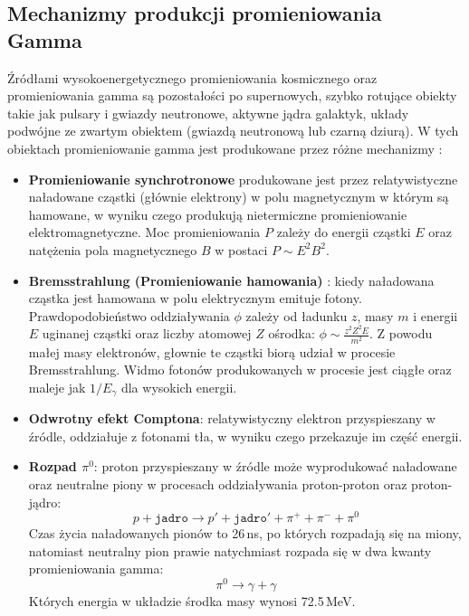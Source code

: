 \documentclass[a4paper,11pt,twoside]{article}
\begin{document}
\subsection{Mechanizmy produkcji promieniowania Gamma}
Źródłami wysokoenergetycznego promieniowania kosmicznego oraz promieniowania gamma są pozostałości po supernowych, szybko rotujące obiekty takie jak pulsary i gwiazdy neutronowe, aktywne jądra galaktyk, układy podwójne ze zwartym obiektem (gwiazdą neutronową lub czarną dziurą). W tych obiektach promieniowanie gamma jest produkowane przez różne mechanizmy \cite{astro_particle}:
\begin{itemize}
\item {\bf{Promieniowanie synchrotronowe}}
produkowane jest przez relatywistyczne naładowane cząstki (głównie elektrony) w polu magnetycznym w którym są hamowane, w wyniku czego produkują nietermiczne promieniowanie elektromagnetyczne. Moc promieniowania $P$ zależy do energii cząstki $E$ oraz natężenia pola magnetycznego $B$ w postaci $P \sim E^2 B^2$.
\item {\bf{Bremsstrahlung} (Promieniowanie hamowania) }:
kiedy naładowana cząstka jest hamowana w polu elektrycznym emituje fotony. Prawdopodobieństwo oddziaływania $\phi$ zależy od ładunku $z$, masy $m$ i energii $E$ uginanej cząstki oraz liczby atomowej $Z$ ośrodka: $\phi \sim \frac{z^2 Z^2 E}{m^2}$. Z powodu małej masy elektronów, głownie te cząstki biorą udział w procesie Bremsstrahlung. Widmo fotonów produkowanych w procesie jest ciągłe oraz maleje jak $1/E_{\gamma}$ dla wysokich energii.  
\item {\bf{Odwrotny efekt Comptona}}:
relatywistyczny elektron przyspieszany w źródle, oddziałuje z fotonami tła, w wyniku czego przekazuje im część energii.
\item {\bf{Rozpad $\pi^0$}}: proton przyspieszany w źródle może wyprodukować naładowane oraz neutralne piony w procesach oddziaływania proton-proton oraz proton-jądro:
\begin{equation}
p + \mathtt{jadro} \rightarrow p' + \mathtt{jadro'} + \pi^+ + \pi^- + \pi^0
\end{equation} 
Czas życia naładowanych pionów to 26\,ns, po których rozpadają się na miony, natomiast neutralny pion prawie natychmiast rozpada się w dwa kwanty promieniowania gamma:
\begin{equation}
\pi^0 \rightarrow \gamma + \gamma
\end{equation}
Których energia w układzie środka masy wynosi 72.5\,MeV.
\end{itemize}
\end{document}

